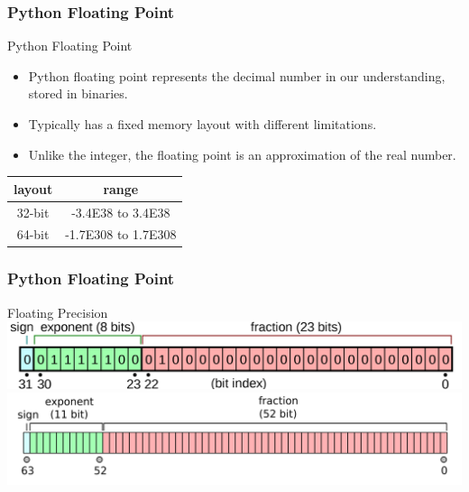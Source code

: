 \documentclass{beamer}
\begin{document}
    \begin{frame}[fragile]
        \frametitle{Python Floating Point}
        \begin{block}{Python Floating Point}
            \begin{itemize}
                \item Python floating point represents the decimal number in our understanding, stored in binaries.
                \item Typically has a fixed memory layout with different limitations.
                \item Unlike the integer, the floating point is an approximation of the real number.
            \end{itemize}
            \begin{center}
                \begin{tabular}{|c|c|}
                    \hline
                    \textbf{layout} & \textbf{range} \\
                    \hline
                    32-bit & -3.4E38 to 3.4E38 \\
                    64-bit & -1.7E308 to 1.7E308 \\
                    \hline
                \end{tabular}
            \end{center}
        \end{block}
    \end{frame}

    \begin{frame}[fragile]
        \frametitle{Python Floating Point}
        \begin{exampleblock}{Floating Precision}
            \includegraphics[width=1\textwidth]{figures/FP32.png}
            \includegraphics[width=1\textwidth]{figures/FP64.png}
        \end{exampleblock}
    \end{frame}
\end{document}
